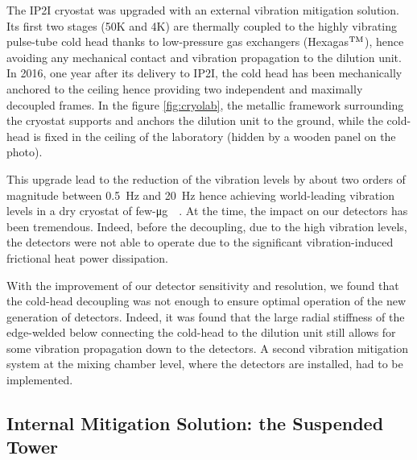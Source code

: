The IP2I cryostat was upgraded with an external vibration mitigation solution. Its first two stages (50K and 4K) are thermally coupled to the highly vibrating pulse-tube cold head thanks to low-pressure gas exchangers (Hexagas$^{\rm TM}$), hence avoiding any mechanical contact and vibration propagation to the dilution unit. In 2016, one year after its delivery to IP2I, the cold head has been mechanically anchored to the ceiling hence providing two independent and maximally decoupled frames. In the figure \ref{fig:cryolab}, the metallic framework surrounding the cryostat supports and anchors the dilution unit to the ground, while the cold-head is fixed in the ceiling of the laboratory (hidden by a wooden panel on the photo).

This upgrade lead to the reduction of the vibration levels by about two orders of magnitude between \SI{0.5}{\Hz} and \SI{20}{\Hz} hence achieving world-leading vibration levels in a dry cryostat of few-\si{\micro g \per \sqrthz}.
At the time, the impact on our detectors has been tremendous. Indeed, before the decoupling, due to the high vibration levels, the detectors were not able to operate due to the significant vibration-induced  frictional heat power dissipation. 

With the improvement of our detector sensitivity and resolution, we found that the cold-head decoupling was not enough to ensure optimal operation of the new generation of detectors. Indeed, it was found that the large radial stiffness of the edge-welded below connecting the cold-head to the dilution unit still allows for some vibration propagation down to the detectors. A second vibration mitigation system at the mixing chamber level, where the detectors are installed, had to be implemented.


\subsection{Internal Mitigation Solution: the Suspended Tower}


